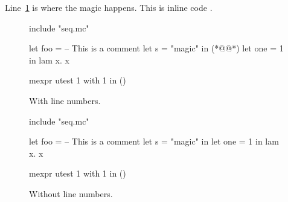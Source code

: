 \documentclass{article}
\begin{document}
Line~\ref{l:magic} is where the magic happens. This is inline code
.

\begin{figure}[h]
  \begin{mcore-lines}
  include "seq.mc"

  let foo =
    -- This is a comment
    let s = "magic" in (*@\label{l:magic}@*)
    let one = 1 in
    lam x. x

  mexpr
    utest 1 with 1 in ()
  \end{mcore-lines}
  \caption{With line numbers.}
\end{figure}

\begin{figure}[h]
  \begin{mcore}
  include "seq.mc"

  let foo =
    -- This is a comment
    let s = "magic" in
    let one = 1 in
    lam x. x

  mexpr
    utest 1 with 1 in ()
  \end{mcore}
  \caption{Without line numbers.}
\end{figure}


\end{document}

